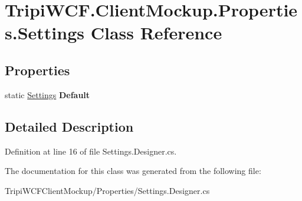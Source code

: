 \hypertarget{class_tripi_w_c_f_1_1_client_mockup_1_1_properties_1_1_settings}{
\section{TripiWCF.ClientMockup.Properties.Settings Class Reference}
\label{class_tripi_w_c_f_1_1_client_mockup_1_1_properties_1_1_settings}
}
\subsection*{Properties}
\begin{DoxyCompactItemize}
\item 
\hypertarget{class_tripi_w_c_f_1_1_client_mockup_1_1_properties_1_1_settings_a8d6fcfac063f3239a71fbc0b42fe1129}{
static \hyperlink{class_tripi_w_c_f_1_1_client_mockup_1_1_properties_1_1_settings}{Settings} {\bfseries Default}}
\label{class_tripi_w_c_f_1_1_client_mockup_1_1_properties_1_1_settings_a8d6fcfac063f3239a71fbc0b42fe1129}

\end{DoxyCompactItemize}


\subsection{Detailed Description}


Definition at line 16 of file Settings.Designer.cs.

The documentation for this class was generated from the following file:\begin{DoxyCompactItemize}
\item 
TripiWCFClientMockup/Properties/Settings.Designer.cs\end{DoxyCompactItemize}
